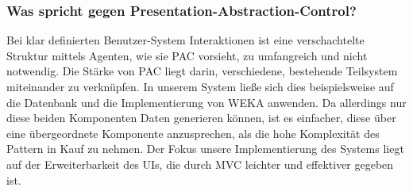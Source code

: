 \subsubsection{Was spricht gegen Presentation-Abstraction-Control?}
Bei klar definierten Benutzer-System Interaktionen ist eine verschachtelte Struktur mittels Agenten, wie sie PAC vorsieht, zu umfangreich und nicht notwendig. 
Die Stärke von PAC liegt darin, verschiedene, bestehende Teilsystem miteinander zu verknüpfen. In unserem System ließe sich dies beispielsweise auf die Datenbank und die Implementierung von WEKA anwenden. Da allerdings nur diese beiden Komponenten Daten generieren können, ist es einfacher, diese über eine übergeordnete Komponente anzusprechen, als die hohe Komplexität des Pattern in Kauf zu nehmen. 
Der Fokus unsere Implementierung des Systems liegt auf der Erweiterbarkeit des UIs, die durch MVC leichter und effektiver gegeben ist.